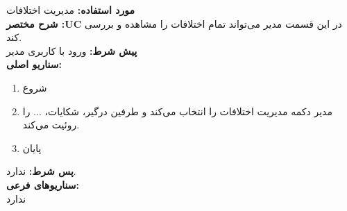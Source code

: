 \textbf{مورد استفاده:}
مدیریت ‌اختلافات
\\
\textbf{شرح مختصر :UC}
در این قسمت مدیر می‌تواند تمام اختلافات را مشاهده و بررسی ‌کند.
\\
\textbf{پيش شرط:}
ورود با کاربری مدیر
\\
\textbf{سناريو اصلی:}
\begin{enumerate}
	\item
	شروع
	\item
	مدیر دکمه مدیریت اختلافات را انتخاب می‌کند و طرفین درگیر، شکایات، ... را روئیت می‌کند.
	\item
	پایان
\end{enumerate}

\noindent
\textbf{پس شرط:}
ندارد.
\\
\textbf{سناريوهای فرعی:}
\\
ندارد

